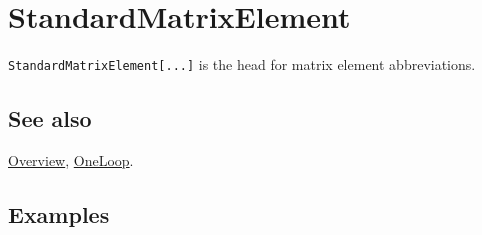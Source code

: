 \documentclass[../FeynCalcManual.tex]{subfiles}
\begin{document}
\hypertarget{standardmatrixelement}{%
\section{StandardMatrixElement}\label{standardmatrixelement}}

\texttt{StandardMatrixElement[\allowbreak{}...]} is the head for matrix
element abbreviations.

\subsection{See also}

\hyperlink{toc}{Overview}, \hyperlink{oneloop}{OneLoop}.

\subsection{Examples}
\end{document}
